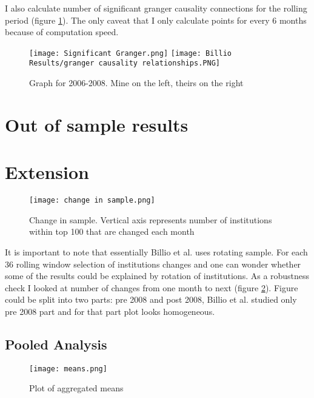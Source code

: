 \documentclass[preprint,pre,floats,aps,amsmath,amssymb]{revtex4}
\begin{document}
I also calculate number of significant granger causality connections for the rolling period (figure \ref{fig:rollingGranger}). The only caveat that I only calculate points for every 6 months because of computation speed.


\begin{figure}[ht]
\texttt{[image: Significant Granger.png]}
\texttt{[image: Billio Results/granger causality relationships.PNG]}

\caption{Graph for 2006-2008. Mine on the left, theirs on the right }
\label{fig:rollingGranger}
\end{figure}




\section{Out of sample results}

\section{Extension}

\begin{figure}[ht]
\texttt{[image: change in sample.png]}

\caption{Change in sample. Vertical axis represents number of institutions within top 100 that are changed each month}
\label{fig:change}
\end{figure}


It is important to note that essentially Billio et al. uses rotating sample. For each 36 rolling window selection of institutions changes and one can wonder whether some of the results could be explained by rotation of institutions. As a robustness check I looked at number of changes from one month to next (figure \ref{fig:change}). Figure could be split into two parts: pre 2008 and post 2008, Billio et al. studied only pre 2008 part and for that part plot looks homogeneous. 
 

\subsection{Pooled Analysis}

\begin{figure}[ht]
\texttt{[image: means.png]}

\caption{Plot of aggregated means }
\label{fig:means}
\end{figure}
\end{document}
